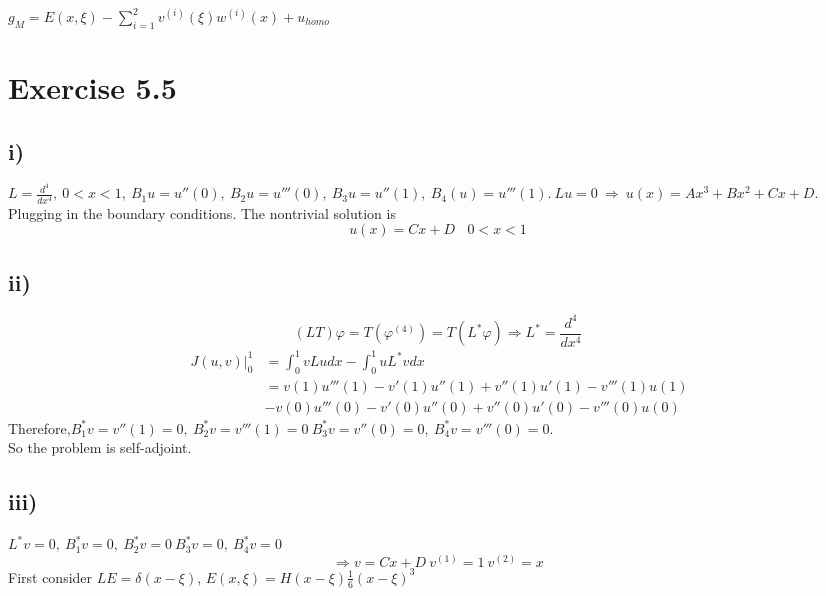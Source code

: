 \documentclass[a4paper, 11pt]{article}
\begin{document}
\begin{spacing}{1.5}
$g_M = E(x,\xi) - \sum_{i=1}^{2}v^{(i)}(\xi) w^{(i)}(x) + u_{homo}$


\section*{Exercise 5.5}
\subsection*{i)}
$L = \frac{d^4}{dx^4}, \ 0<x<1, \ B_1u=u''(0) , \ B_2u=u'''(0), \ B_3u=u''(1), \ B_4(u) = u'''(1). \ Lu=0 \  \Rightarrow \ u(x) = Ax^3 + Bx^2 + Cx + D$. \\
Plugging in the boundary conditions. The nontrivial solution is 
$$
    u(x) = Cx+D  \ \ \ \ 0<x<1
$$

\subsection*{ii)}
$$
    (LT) \varphi = T(\varphi^{(4)}) = T(L^*\varphi) \Rightarrow L^* = \frac{d^4}{dx^4}
$$
\begin{align*}\
J(u,v)\Big|_0^1 
& = \int_{0}^{1} vLudx - \int_{0}^{1} uL^*vdx  \\
& = v(1) u'''(1) - v'(1)u''(1) + v''(1) u'(1) -  v'''(1)u(1)  \\
& -  v(0) u'''(0) - v'(0)u''(0) + v''(0) u'(0) - v'''(0) u(0) 
\end{align*}
Therefore,$ B_1^*v = v''(1) =0 , \ B_2^*v = v'''(1) = 0 \ B_3^*v = v''(0) = 0 , \ B_4^*v = v'''(0) = 0$. \\
So the problem is self-adjoint.

\subsection*{iii)}
$L^*v=0, \ B_1^*v = 0 , \ B_2^*v = 0 \ B_3^*v = 0 , \ B_4^*v = 0$
$$
    \Rightarrow v= Cx+D \ v^{(1)} = 1 \ v^{(2)} = x
$$
First consider $LE=\delta(x-\xi)$, $E(x,\xi) = H(x-\xi) \frac{1}{6} (x-\xi)^3$

\end{spacing}
\end{document}
